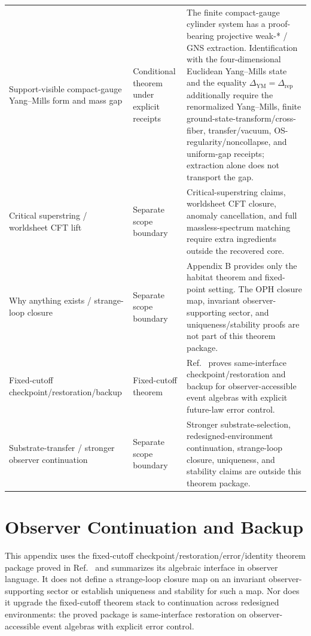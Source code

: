 \begin{center}
\begin{tabular}{@{}>{\raggedright\arraybackslash}p{}>{\raggedright\arraybackslash}p{}>{\raggedright\arraybackslash}p{}@{}}
Support-visible compact-gauge Yang--Mills form and mass gap & Conditional theorem under explicit receipts & The finite compact-gauge cylinder system has a proof-bearing projective weak-* / GNS extraction. Identification with the four-dimensional Euclidean Yang--Mills state and the equality \(\Delta_{\mathrm{YM}}=\Delta_{\mathrm{rep}}\) additionally require the renormalized Yang--Mills, finite ground-state-transform/cross-fiber, transfer/vacuum, OS-regularity/noncollapse, and uniform-gap receipts; extraction alone does not transport the gap. \\
Critical superstring / worldsheet CFT lift & Separate scope boundary & Critical-superstring claims, worldsheet CFT closure, anomaly cancellation, and full massless-spectrum matching require extra ingredients outside the recovered core. \\
Why anything exists / strange-loop closure & Separate scope boundary & Appendix B provides only the habitat theorem and fixed-point setting. The OPH closure map, invariant observer-supporting sector, and uniqueness/stability proofs are not part of this theorem package. \\
Fixed-cutoff checkpoint/restoration/backup & Fixed-cutoff theorem & Ref.~\cite{ophmicrophysics} proves same-interface checkpoint/restoration and backup for observer-accessible event algebras with explicit future-law error control. \\
Substrate-transfer / stronger observer continuation & Separate scope boundary & Stronger substrate-selection, redesigned-environment continuation, strange-loop closure, uniqueness, and stability claims are outside this theorem package. \\
\bottomrule
\end{tabular}
\end{center}

\section{Observer Continuation and Backup}

This appendix uses the fixed-cutoff checkpoint/restoration/error/identity theorem package proved
in Ref.~\cite{ophmicrophysics} and summarizes its algebraic interface in observer language. It
does not define a strange-loop closure map on an invariant observer-supporting sector or establish
uniqueness and stability for such a map. Nor does it upgrade the fixed-cutoff theorem stack to
continuation across redesigned environments: the proved package is same-interface restoration on
observer-accessible event algebras with explicit error control.

